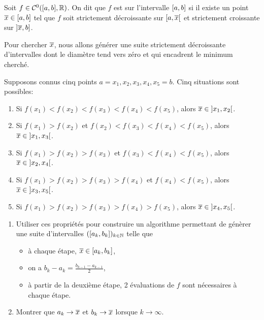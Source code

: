 \begin{td-exo} %
    Soit \(f\in \mathcal{C}^0(\mathopen{}\left[a,b\right]\mathclose{},\mathbb{R})\).
    On dit que \(f\) est  sur l'intervalle \(\mathopen{}\left[a,b\right]\mathclose{}\) si
    il existe un point \(\overline{x}\in\mathopen{}\left[a,b\right]\mathclose{}\) tel que
    \(f\) soit strictement décroissante sur \(\mathopen{}\left[a,\overline{x}\right[\mathclose{}\) et strictement
    croissante sur \(\mathopen{}\left]\overline{x},b\right]\mathclose{}\).

    Pour chercher \(\overline{x}\), nous allons générer une suite strictement décroissante d'intervalles
    dont le diamètre tend vers zéro et qui encadrent le minimum cherché.

    Supposons connus cinq points \(a = x_1, x_2, x_3, x_4, x_5 = b\). Cinq situations
    sont possibles:
    \begin{enumerate}[label=(\roman*)] %
        \item Si \(f(x_1) < f(x_2) < f(x_3) < f(x_4) < f(x_5)\), alors \(\overline{x}\in\mathopen{}\left]x_1,x_2\right[\mathclose{}\).
        \item Si \(f(x_1) > f(x_2)\) et \(f(x_2) < f(x_3) < f(x_4) < f(x_5)\), alors \(\overline{x}\in\mathopen{}\left]x_1,x_3\right[\mathclose{}\).
        \item Si \(f(x_1) > f(x_2) > f(x_3)\) et \(f(x_3) < f(x_4) < f(x_5)\), alors \(\overline{x}\in\mathopen{}\left]x_2,x_4\right[\mathclose{}\).
        \item Si \(f(x_1) > f(x_2) > f(x_3) > f(x_4)\) et \(f(x_4) < f(x_5)\), alors \(\overline{x}\in\mathopen{}\left]x_3,x_5\right[\mathclose{}\).
        \item Si \(f(x_1) > f(x_2) > f(x_3) > f(x_4) > f(x_5)\), alors \(\overline{x}\in\mathopen{}\left]x_4,x_5\right[\mathclose{}\).
    \end{enumerate}

    \begin{enumerate}[label=(\alph*)]
        \item Utiliser ces propriétés pour construire un algorithme permettant de génèrer une suite d'intervalles
        \((\mathopen{}\left[a_k, b_k\right]\mathclose{})_{k\in\mathbb{N}}\) telle que
        \begin{itemize}
            \item à chaque étape, \(\overline{x} \in \mathopen{}\left[a_k, b_k\right]\mathclose{}\),
            \item on a \(b_k - a_k = \frac{b_{k-1} - a_{k-1}}{2}\),
            \item à partir de la deuxième étape, 2 évaluations de \(f\) sont
            nécessaires à chaque étape.
        \end{itemize}

        \item Montrer que \(a_k \to \overline{x}\) et \(b_k \to \overline{x}\) lorsque \(k\to\infty\).
    \end{enumerate}
\end{td-exo}
